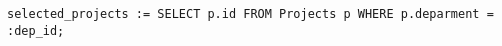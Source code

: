 \documentclass[english]{sig-alternate-05-2015}
\begin{document}
%
%

\begin{lstlisting}[language=HanaSQL,float,caption={Example query in line 4 of "Check\_Projects"},label=lst:example3]
	selected_projects := SELECT p.id FROM Projects p WHERE p.deparment = :dep_id;
\end{lstlisting}
\end{document}
